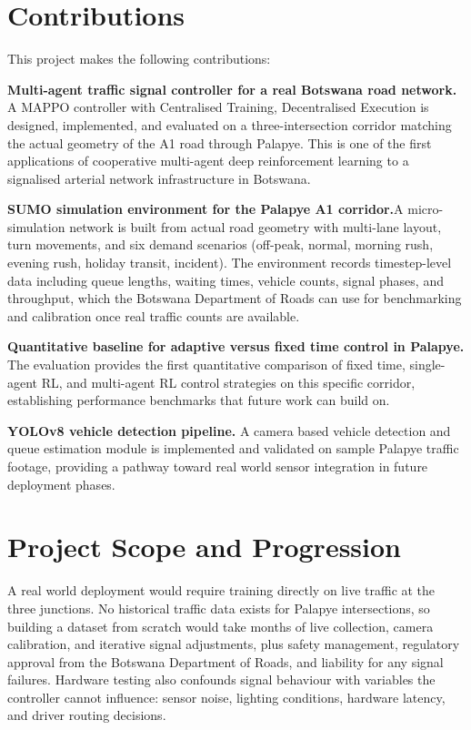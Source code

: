 ﻿\documentclass[11pt, a4paper]{report}
\begin{document}
\section{Contributions}

This project makes the following contributions:

\textbf{Multi-agent traffic signal controller for a real Botswana road network.}  A MAPPO controller with Centralised Training, Decentralised Execution is
  designed, implemented, and evaluated on a three-intersection corridor matching
  the actual geometry of the A1 road through Palapye. This is one of the first
  applications of cooperative multi-agent deep reinforcement learning to a
  signalised arterial network infrastructure in Botswana.

\textbf{SUMO simulation environment for the Palapye A1 corridor.}A micro-simulation network is built from actual road geometry with multi-lane
  layout, turn movements, and six demand scenarios (off-peak, normal, morning
  rush, evening rush, holiday transit, incident). The environment records
  timestep-level data including queue lengths, waiting times, vehicle counts,
  signal phases, and throughput, which the Botswana Department of Roads can use
  for benchmarking and calibration once real traffic counts are available.

\textbf{Quantitative baseline for adaptive versus fixed time control in Palapye.} The evaluation provides the first quantitative comparison of fixed time, single-agent RL, and multi-agent RL control strategies on this specific corridor, establishing performance benchmarks that future work can build on.

\textbf{YOLOv8 vehicle detection pipeline.} A camera based vehicle detection and queue estimation module is implemented and validated on sample Palapye traffic footage, providing a pathway toward real world sensor integration in future deployment phases.


\section{Project Scope and Progression}
A real world deployment would require training directly on live traffic at the
  three junctions. No historical traffic data exists for Palapye intersections, so
   building a dataset from scratch would take months of live collection, camera
  calibration, and iterative signal adjustments, plus safety management,
  regulatory approval from the Botswana Department of Roads, and liability for any
   signal failures. Hardware testing also confounds signal behaviour with
  variables the controller cannot influence: sensor noise, lighting conditions,
  hardware latency, and driver routing decisions.
\end{document}
